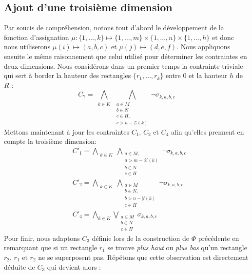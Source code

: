 \documentclass[a4paper]{article}
\begin{document}
\subsection{Ajout d'une troisième dimension}
Par soucis de compréhension, notons tout d'abord le développement de la fonction d'assignation $\mu :\{1,\dots,k\} \mapsto \{1,\dots,m\}\times\{1,\dots,n\}\times\{1,\dots,h\}$ et donc nous utiliserons $\mu(i) \mapsto (a, b, c)$ et $ \mu(j) \mapsto (d, e, f)$.
Nous appliquons ensuite le même raisonnement que celui utilisé pour déterminer les contraintes en deux dimensions. Nous considérons dans un premier temps la contrainte triviale qui sert à border la hauteur des rectangles $\{r_1,\dots ,r_k\}$ entre $0$ et la hauteur $h$ de $R$ :
\begin{equation*}
    C_7 = \bigwedge\limits_{\substack{k\in K}} \bigwedge\limits_{\substack{a \in M \\ b \in N\\ c\in H, \\ c > h - \mathcal{Z}(k)}} \lnot \sigma_{k,a, b, c}
\end{equation*}
Mettons maintenant à jour les contraintes $C_1$, $C_2$ et $C_4$ afin qu'elles prennent en compte la troisième dimension:
\begin{equation*}
\begin{split}
	&C'_1 = \bigwedge\limits_{\substack{k\in K}} \bigwedge\limits_{\substack{a \in M, \\ a > m - \mathcal{X}(k) \\ b\in N \\ c\in H}} \lnot \sigma_{k,a, b, c}\\
    &C'_2 = \bigwedge\limits_{\substack{k\in K}} \bigwedge\limits_{\substack{a \in M \\ b \in N,\\ b > n - \mathcal{Y}(k) \\ c\in H}} \lnot \sigma_{k,a, b, c}\\
    &C'_4 = \bigwedge\limits_{k\in K} \bigvee\limits_{\substack{a\in M \\ b \in N \\ c \in H}} \sigma_{k,a,b,c}
\end{split}
\end{equation*}
Pour finir, nous adaptons $C_3$ définie lors de la construction de $\Phi$ précédente en remarquant que si un rectangle $r_1$ se trouve \textit{plus haut} ou \textit{plus bas} qu'un rectangle $r_2$, $r_1$ et $r_2$ ne se superposent pas. Répétons que cette observation est directement déduite de $C_3$ qui devient alors :
\end{document}
